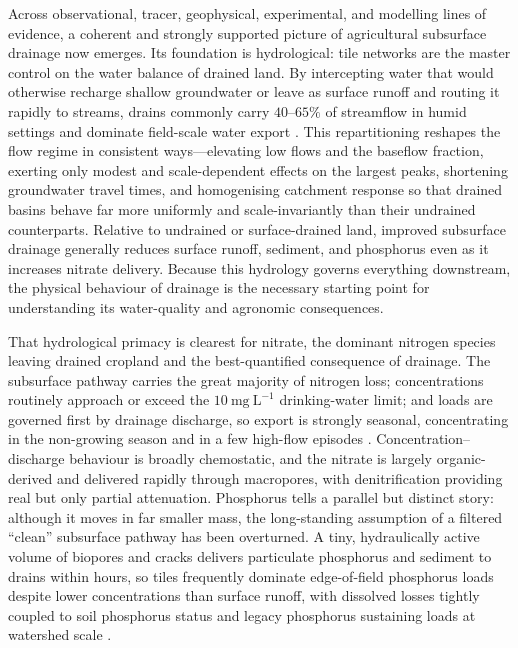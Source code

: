 Across observational, tracer, geophysical, experimental, and modelling lines
of evidence, a coherent and strongly supported picture of agricultural
subsurface drainage now emerges. Its foundation is hydrological: tile networks
are the master control on the water balance of drained land. By intercepting
water that would otherwise recharge shallow groundwater or leave as surface
runoff and routing it rapidly to streams, drains commonly carry $40$--$65\%$ of
streamflow in humid settings and dominate field-scale water export
\parencite{Schilling2019}. This
repartitioning reshapes the flow regime in consistent ways---elevating low
flows and the baseflow fraction, exerting only modest and scale-dependent
effects on the largest peaks, shortening groundwater travel times, and
homogenising catchment response so that drained basins behave far more
uniformly and scale-invariantly than their undrained counterparts. Relative to
undrained or surface-drained land, improved subsurface drainage generally
reduces surface runoff, sediment, and phosphorus even as it increases nitrate
delivery. Because this hydrology governs everything downstream, the physical
behaviour of drainage is the necessary starting point for understanding its
water-quality and agronomic consequences.

That hydrological primacy is clearest for nitrate, the dominant nitrogen
species leaving drained cropland and the best-quantified consequence of
drainage. The subsurface pathway carries the great majority of nitrogen loss;
concentrations routinely approach or exceed the $10~\mathrm{mg~L^{-1}}$
drinking-water limit; and loads are governed first by drainage discharge, so
export is strongly seasonal, concentrating in the non-growing season and in a
few high-flow episodes \parencite{Kladivko2021,Speir2021}. Concentration--discharge behaviour is broadly
chemostatic, and the nitrate is largely organic-derived and delivered rapidly
through macropores, with denitrification providing real but only partial
attenuation. Phosphorus tells a parallel but distinct story: although it moves
in far smaller mass, the long-standing assumption of a filtered ``clean''
subsurface pathway has been overturned. A tiny, hydraulically active volume of
biopores and cracks delivers particulate phosphorus and sediment to drains
within hours, so tiles frequently dominate edge-of-field phosphorus loads
despite lower concentrations than surface runoff, with dissolved losses tightly
coupled to soil phosphorus status and legacy phosphorus sustaining loads at
watershed scale \parencite{Pease2018,Sharpley1995}.

